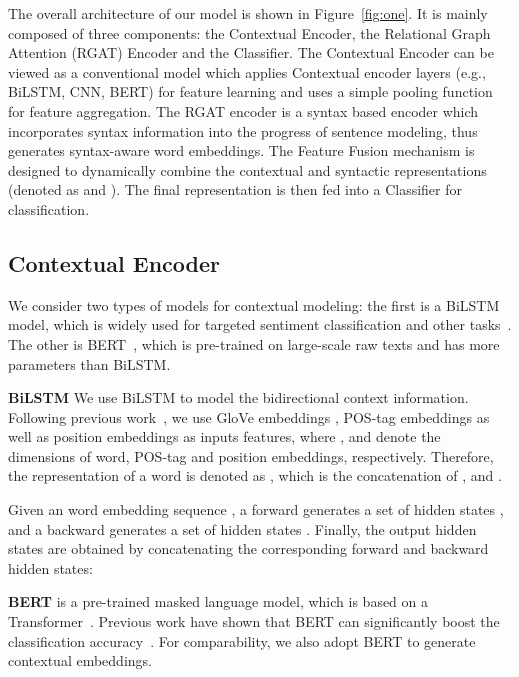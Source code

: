 \documentclass[journal]{IEEEtran}
\begin{document}
	The overall architecture of our model is shown in Figure~\ref{fig:one}. It is mainly composed of three components: the Contextual Encoder, the Relational Graph Attention (RGAT) Encoder and the Classifier. 
	The Contextual Encoder can be viewed as a conventional model which applies Contextual encoder layers (e.g., BiLSTM, CNN, BERT) for feature learning and uses a simple pooling function for feature aggregation.
	The RGAT encoder is a syntax based encoder which incorporates syntax information into the progress of sentence modeling, thus generates syntax-aware word embeddings.
	The Feature Fusion mechanism is designed to dynamically combine the contextual and syntactic representations (denoted as  and ).
	The final representation  is then fed into a Classifier for classification.
	
	\subsection{Contextual Encoder}
	\label{sec:contextual}
	We consider two types of models for contextual modeling: the first is a BiLSTM model, which is widely used for targeted sentiment classification and other tasks~\cite{Sundermeyer2012LSTMNN,Bahdanau2015NeuralMT}. The other is BERT~\cite{devlin-etal-2019-bert}, which is pre-trained on large-scale raw texts and has more parameters than BiLSTM.
	
	\noindent\textbf{BiLSTM} 
	We use BiLSTM to model the bidirectional context information. Following previous work~\cite{sun-etal-2019-aspect}, we use GloVe embeddings , POS-tag embeddings  as well as position embeddings  as inputs features, where
	,  and  denote the dimensions of word, POS-tag and position embeddings, respectively.
	Therefore, the representation of a word  is denoted as , which is the concatenation of ,  and .
	
	Given an word embedding sequence , a forward  generates a set of hidden states , and a backward  generates a set of hidden states . 
	Finally, the  output hidden states  are obtained by concatenating the corresponding forward and backward hidden states:
	
	
	\noindent\textbf{BERT} is a pre-trained masked language model, which is based on a Transformer~\cite{Vaswani2017AttentionIA}.
	Previous work have shown that BERT can significantly boost the classification accuracy~\cite{Song2019AttentionalEN,Gao19bertABSA,li-etal-2019-exploiting}. 
	For comparability, we also adopt BERT to generate contextual embeddings.
	
\end{document}
